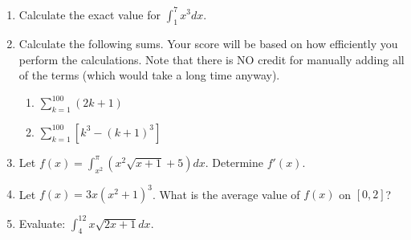 \documentclass[letterpaper,12pt,fleqn]{article}
\begin{document}
\begin{enumerate}[left=0pt,itemsep=0.5in]
\item Calculate the exact value for \(\int_1^7x^3dx\).

  \newpage

\item Calculate the following sums.  Your score will be based on how efficiently you perform the calculations.  Note
  that there is NO credit for manually adding all of the terms (which would take a long time anyway).
  \begin{enumerate}
  \item \(\displaystyle\sum_{k=1}^{100}(2k+1)\)
  \item \(\displaystyle\sum_{k=1}^{100}[k^3-(k+1)^3]\)
  \end{enumerate}

\item Let \(\displaystyle f(x)=\int_{x^2}^\pi(x^2\sqrt{x+1}+5)dx\).  Determine \(f'(x)\).

\item Let \(f(x)=3x(x^2+1)^3\).  What is the average value of \(f(x)\) on \([0,2]\)?

\item Evaluate: \(\displaystyle\int_4^{12}x\sqrt{2x+1}dx\).

\end{enumerate}
\end{document}
